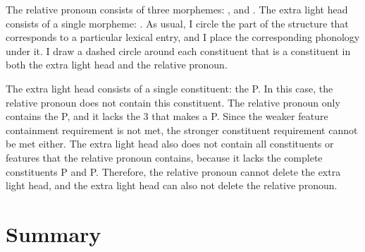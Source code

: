 The relative pronoun consists of three morphemes: ,  and .
The extra light head consists of a single morpheme: .
As usual, I circle the part of the structure that corresponds to a particular lexical entry, and I place the corresponding phonology under it.
I draw a dashed circle around each constituent that is a constituent in both the extra light head and the relative pronoun.

The extra light head consists of a single constituent: the P.
In this case, the relative pronoun does not contain this constituent. The relative pronoun only contains the P, and it lacks the 3 that makes a P. Since the weaker feature containment requirement is not met, the stronger constituent requirement cannot be met either.
The extra light head also does not contain all constituents or features that the relative pronoun contains, because it lacks the complete constituents P and P.
Therefore, the relative pronoun cannot delete the extra light head, and the extra light head can also not delete the relative pronoun.


\section{Summary}
